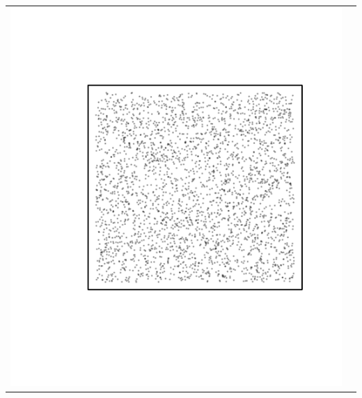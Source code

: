 \documentclass{article}\usepackage{graphicx, color}
\makeatletter
\def\maxwidth{ %
  \ifdim\Gin@nat@width>\linewidth
    \linewidth
  \else
    \Gin@nat@width
  \fi
}
\newenvironment{knitrout}{}{} %
\makeatother
\begin{document}
\vspace*{-1.75in}
\begin{tabular}{cc}
\begin{knitrout}
\definecolor{shadecolor}{rgb}{0.969, 0.969, 0.969}\color{fgcolor}\includegraphics[width=\maxwidth]{figure/unnamed-chunk-29} 
\end{knitrout}


\end{tabular}
\end{document}
